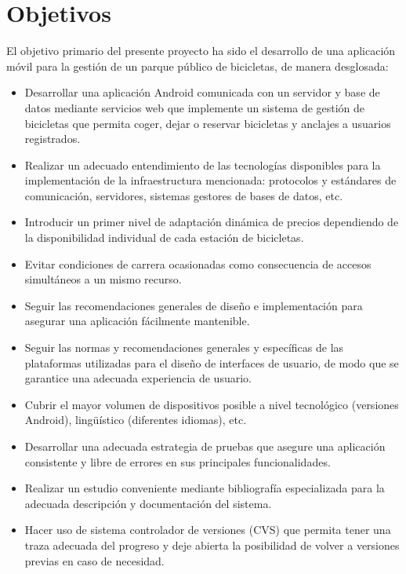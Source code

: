 \chapter{Objetivos}
\label{ch:objetivos}

El objetivo primario del presente proyecto ha sido el desarrollo de una aplicación móvil para la gestión de un parque público de bicicletas, de manera desglosada:

\begin{itemize}  
	\item Desarrollar una aplicación Android comunicada con un servidor y base de datos mediante servicios web que implemente un sistema de gestión de bicicletas que permita coger, dejar o reservar bicicletas y anclajes a usuarios registrados.
	\item Realizar un adecuado entendimiento de las tecnologías disponibles para la implementación de la infraestructura mencionada: protocolos y estándares de comunicación, servidores, sistemas gestores de bases de datos, etc.
	\item Introducir un primer nivel de adaptación dinámica de precios dependiendo de la disponibilidad individual de cada estación de bicicletas.
	\item Evitar condiciones de carrera ocasionadas como consecuencia de accesos simultáneos a un mismo recurso.
	\item Seguir las recomendaciones generales de diseño e implementación para asegurar una aplicación fácilmente mantenible.
	\item Seguir las normas y recomendaciones generales y específicas de las plataformas utilizadas para el diseño de interfaces de usuario, de modo que se garantice una adecuada experiencia de usuario.
	\item Cubrir el mayor volumen de dispositivos posible a nivel tecnológico (versiones Android), lingüístico (diferentes idiomas), etc.
	\item Desarrollar una adecuada estrategia de pruebas que asegure una aplicación consistente y libre de errores en sus principales funcionalidades.
	\item Realizar un estudio conveniente mediante bibliografía especializada para la adecuada descripción y documentación del sistema.
	\item Hacer uso de sistema controlador de versiones (CVS) que permita tener una traza adecuada del progreso y deje abierta la posibilidad de volver a versiones previas en caso de necesidad.
\end{itemize}


